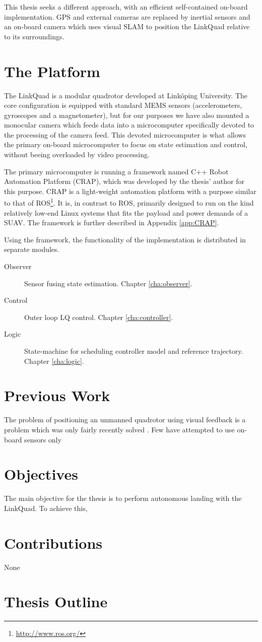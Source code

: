     This thesis seeks a different approach, with an efficient self-contained
    on-board implementation. GPS and external cameras are replaced by inertial sensors and an
    on-board camera which uses visual SLAM to position the LinkQuad relative to
    its surroundings.

\section{The Platform}
    The LinkQuad is a modular quadrotor developed at Linköping University.
    The core configuration is equipped with standard MEMS sensors
    (accelerometers, gyroscopes and a magnetometer),
    but for our purposes we have also mounted a monocular camera which feeds data
    into a microcomputer specifically devoted to the processing of the camera feed.
    This devoted microcomputer is what allows the primary on-board microcomputer
    to focus on state estimation and control, without beeing overloaded by
    video processing.

    The primary microcomputer is running a framework named C++ Robot Automation Platform (CRAP),
    which was developed by the thesis' author for this purpose. CRAP is a light-weight
    automation platform with a purpose similar to that of ROS\footnote{\url{http://www.ros.org/}}.
    It is, in contrast to ROS, primarily designed to run on the kind relatively low-end Linux systems
    that fits the payload and power demands of a SUAV. The framework is further
    described in Appendix \ref{app:CRAP}.

    Using the framework, the functionality of the implementation is
    distributed in separate modules.
    \begin{description}
        \item[Observer] Sensor fusing state estimation. Chapter \ref{cha:observer}.
        \item[Control]  Outer loop LQ control. Chapter \ref{cha:controller}.
        \item[Logic]    State-machine for scheduling controller model and reference trajectory. Chapter \ref{cha:logic}.
    \end{description}

\section{Previous Work}
    The problem of positioning an unmanned quadrotor using
    visual feedback is a problem which was only fairly recently solved
    \citep{DBLP:conf/icra/BloschWSS10,weiss11monocular}.
    Few have attempted to use on-board sensors only


\section{Objectives}
    The main objective for the thesis is to perform autonomous landing
    with the LinkQuad. To achieve this,

\section{Contributions}
    None

\section{Thesis Outline}
